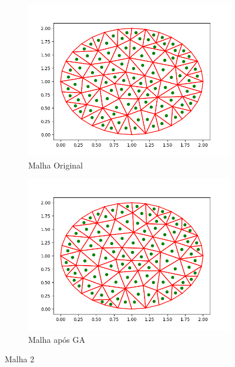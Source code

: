 \documentclass[review]{elsarticle}
\begin{document}
\begin{figure}[]
    \begin{subfigure}{1\hsize}
        \centering
        \includegraphics[width=1\textwidth]{malha2-original.png}
        \caption{Malha Original}
        \label{fig:malha-original}
    \end{subfigure}
    \begin{subfigure}{1\hsize}
        \centering
        \includegraphics[width=1\textwidth]{malha2-ga.png}
        \caption{Malha após GA}
        \label{fig:malha-ga}
    \end{subfigure}

    \caption{Malha 2}
    \label{fig:malha2}
\end{figure}
\end{document}
